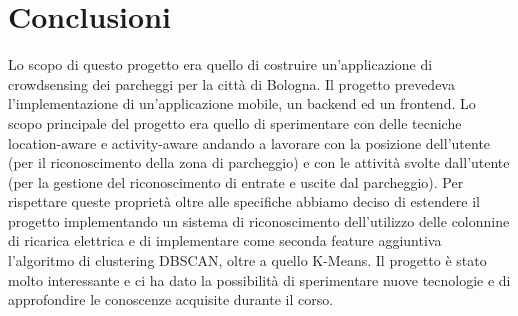 \documentclass[../../Report.tex]{subfiles}
\begin{document}
\chapter{Conclusioni}
Lo scopo di questo progetto era quello di costruire un'applicazione di crowdsensing dei parcheggi per la città di Bologna. Il progetto prevedeva l'implementazione di un'applicazione mobile, un backend ed un frontend. Lo scopo principale del progetto era quello di sperimentare con delle tecniche location-aware e activity-aware andando a lavorare con la posizione dell'utente (per il riconoscimento della zona di parcheggio) e con le attività svolte dall'utente (per la gestione del riconoscimento di entrate e uscite dal parcheggio). Per rispettare queste proprietà oltre alle specifiche abbiamo deciso di estendere il progetto implementando un sistema di riconoscimento dell'utilizzo delle colonnine di ricarica elettrica e di implementare come seconda feature aggiuntiva l'algoritmo di clustering DBSCAN, oltre a quello K-Means. Il progetto è stato molto interessante e ci ha dato la possibilità di sperimentare nuove tecnologie e di approfondire le conoscenze acquisite durante il corso. 
\end{document}
